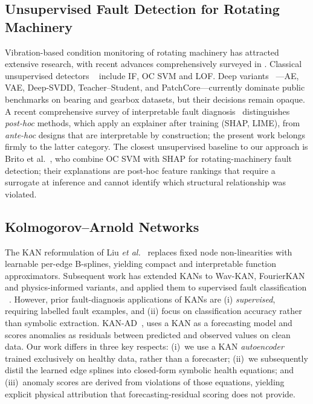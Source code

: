 \documentclass[conference]{IEEEtran}
\begin{document}
\subsection{Unsupervised Fault Detection for Rotating Machinery}
Vibration-based condition monitoring of rotating machinery has attracted
extensive research, with recent advances comprehensively surveyed
in \cite{cbmsurvey2025}. Classical unsupervised detectors ~\cite{IsolationForest, OCSVM, LOF} include IF, OC SVM and LOF. Deep
variants~\cite{autoencref, vaeref, deeponeclassref, teacherstudent, patchcoreref} ---AE, VAE, Deep-SVDD, Teacher--Student, and PatchCore---currently dominate public benchmarks
on bearing and gearbox datasets, but their decisions remain
opaque. A recent comprehensive survey of interpretable fault
diagnosis~\cite{ieeaccessinterp2024} distinguishes \emph{post-hoc}
methods, which apply an explainer after training (SHAP, LIME), from
\emph{ante-hoc} designs that are interpretable by construction; the
present work belongs firmly to the latter category. The closest
unsupervised baseline to our approach is Brito
et al.~\cite{britoshaprm2022}, who combine OC SVM with SHAP
for rotating-machinery fault detection; their explanations are
post-hoc feature rankings that require a surrogate at inference
and cannot identify which structural relationship was violated.

\subsection{Kolmogorov--Arnold Networks}
The KAN reformulation of Liu \emph{et al.}~\cite{liu2024kan}
replaces fixed node non-linearities with learnable per-edge
B-splines, yielding compact and interpretable function
approximators. Subsequent work has extended KANs to Wav-KAN,
FourierKAN and physics-informed variants, and applied them
to supervised fault classification ~\cite{wind}. However, prior fault-diagnosis
applications of KANs are (i) \emph{supervised}, requiring
labelled fault examples, and (ii) focus on classification
accuracy rather than symbolic extraction.
KAN-AD~\cite{kanad2025}, uses a KAN
as a forecasting model and scores anomalies as residuals between
predicted and observed values on clean data. Our work differs in
three key respects: (i)~we use a KAN \emph{autoencoder} trained
exclusively on healthy data, rather than a forecaster; (ii)~we
subsequently distil the learned edge splines into closed-form
symbolic health equations; and (iii)~anomaly scores are derived
from violations of those equations, yielding explicit physical
attribution that forecasting-residual scoring does not provide.
\end{document}
